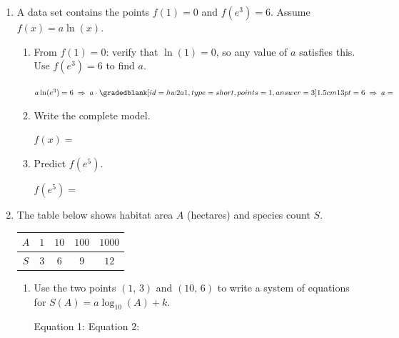 \documentclass[10pt]{article}
\begin{document}
\begin{enumerate}[leftmargin=1.8em, itemsep=14pt]
\item A data set contains the points $f(1) = 0$ and $f(e^3) = 6$. Assume
      $f(x) = a\ln(x)$.

\begin{enumerate}[leftmargin=1.5em, itemsep=8pt, label=\alph*.]
  \item From $f(1) = 0$: verify that $\ln(1) = 0$, so any value of $a$ satisfies this.
        Use $f(e^3) = 6$ to find $a$.

  \vspace{4pt}
  $a\ln(e^3) = 6 \;\Rightarrow\; a \cdot \smash{\gradedblank[id=hw2a1, type=short, points=1, answer={3}]{1.5cm}{13pt}} = 6 \;\Rightarrow\; a = $ \smash{\gradedblank[id=hw2a2, type=short, points=1, answer={2}]{2cm}{13pt}}

  \item Write the complete model.

  \vspace{4pt}
  $f(x) = $ \smash{\gradedblank[id=hw2b, type=short, points=1, answer={2\ln(x)}]{4cm}{13pt}}

  \item Predict $f(e^5)$.

  \vspace{4pt}
  $f(e^5) = $ \smash{\gradedblank[id=hw2c, type=short, points=1, answer={10}]{5cm}{13pt}}
\end{enumerate}

\item The table below shows habitat area $A$ (hectares) and species count $S$.

\vspace{6pt}
\begin{center}
\renewcommand{\arraystretch}{1.8}
\begin{tabular}{|c|c|c|c|c|}
\hline
\rowcolor{sky}
$A$ & $1$ & $10$ & $100$ & $1000$ \\
\hline
$S$ & $3$ & $6$  & $9$   & $12$ \\
\hline
\end{tabular}
\end{center}

\begin{enumerate}[leftmargin=1.5em, itemsep=8pt, label=\alph*.]
  \item Use the two points $(1,\,3)$ and $(10,\,6)$ to write a system of equations
        for $S(A) = a\log_{10}(A) + k$.

  \vspace{4pt}
  Equation 1: \smash{\gradedblank[id=hw3a1, type=short, points=1, answer={3 = a\log_{10}(1) + k}, display={$3 = a\log_{10}(1)+k = k$}]{6cm}{13pt}} \quad Equation 2: \smash{\gradedblank[id=hw3a2, type=short, points=1, answer={6 = a\log_{10}(10) + k}, display={$6 = a\log_{10}(10)+k = a+k$}]{6cm}{13pt}}


\end{enumerate}
\end{enumerate}
\end{document}
